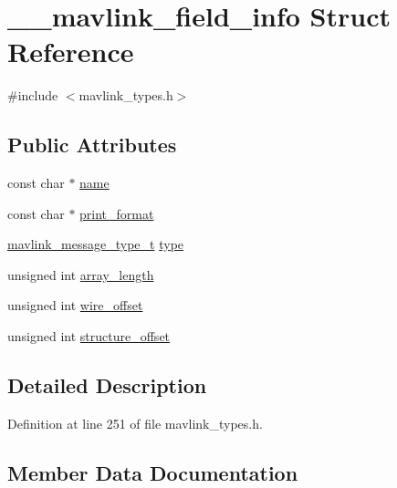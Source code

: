 \hypertarget{struct____mavlink__field__info}{}\section{\+\_\+\+\_\+mavlink\+\_\+field\+\_\+info Struct Reference}
\label{struct____mavlink__field__info}


{\ttfamily \#include $<$mavlink\+\_\+types.\+h$>$}

\subsection*{Public Attributes}
\begin{DoxyCompactItemize}
\item 
const char $\ast$ \mbox{\hyperlink{struct____mavlink__field__info_ab896b0406f6fc7fc6cf55107726b4a7b}{name}}
\item 
const char $\ast$ \mbox{\hyperlink{struct____mavlink__field__info_a373aca57df3879748585f472cff7e3ba}{print\+\_\+format}}
\item 
\mbox{\hyperlink{include__v0_89_2mavlink__types_8h_ab6045b7adc25bdc05a5011a91dc645a4}{mavlink\+\_\+message\+\_\+type\+\_\+t}} \mbox{\hyperlink{struct____mavlink__field__info_a32f98e7c869ae1567c4ad366c74b6552}{type}}
\item 
unsigned int \mbox{\hyperlink{struct____mavlink__field__info_aa3ab268c4176743874c8d05694ed293f}{array\+\_\+length}}
\item 
unsigned int \mbox{\hyperlink{struct____mavlink__field__info_a7156648575e497f112fde78e851dd4d9}{wire\+\_\+offset}}
\item 
unsigned int \mbox{\hyperlink{struct____mavlink__field__info_acb947cd22e51e70e8b5f677b543196ac}{structure\+\_\+offset}}
\end{DoxyCompactItemize}


\subsection{Detailed Description}


Definition at line 251 of file mavlink\+\_\+types.\+h.



\subsection{Member Data Documentation}
\mbox{\label{struct____mavlink__field__info_aa3ab268c4176743874c8d05694ed293f}} 
